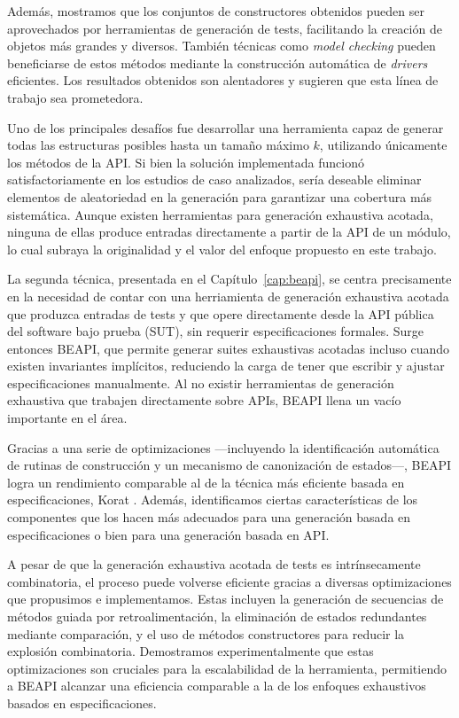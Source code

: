 Además, mostramos que los conjuntos de constructores obtenidos pueden ser aprovechados por herramientas de generación de tests, facilitando la creación de objetos más grandes y diversos. 
También técnicas como \emph{model checking} pueden beneficiarse de estos métodos mediante la construcción automática de \emph{drivers} eficientes. 
Los resultados obtenidos son alentadores y sugieren que esta línea de trabajo sea prometedora.

Uno de los principales desafíos fue desarrollar una herramienta capaz de generar todas las estructuras posibles hasta un tamaño máximo \(k\), 
utilizando únicamente los métodos de la API. Si bien la solución implementada funcionó satisfactoriamente en los estudios de caso analizados, 
sería deseable eliminar elementos de aleatoriedad en la generación para garantizar una cobertura más sistemática. 
Aunque existen herramientas para generación exhaustiva acotada, ninguna de ellas produce entradas directamente a partir de la API de un módulo, 
lo cual subraya la originalidad y el valor del enfoque propuesto en este trabajo.

La segunda técnica, presentada en el Capítulo~\ref{cap:beapi}, se centra precisamente en la necesidad de contar con una herriamienta
de generación exhaustiva acotada que produzca entradas de tests y que opere directamente desde la API pública del software bajo prueba (SUT), sin requerir especificaciones formales.
Surge entonces BEAPI, que permite generar suites exhaustivas acotadas incluso cuando existen invariantes implícitos, 
reduciendo la carga de tener que escribir y ajustar especificaciones manualmente.
Al no existir herramientas de generación exhaustiva que trabajen directamente sobre APIs, BEAPI llena un vacío importante en el área.

Gracias a una serie de optimizaciones —incluyendo la identificación automática de rutinas de construcción y un mecanismo de canonización de estados—, 
BEAPI logra un rendimiento comparable al de la técnica más eficiente basada en especificaciones, Korat \cite{Boyapati02}. 
Además, identificamos ciertas características de los componentes que los hacen más adecuados para una generación basada en especificaciones o bien para una generación basada en API.

A pesar de que la generación exhaustiva acotada de tests es intrínsecamente combinatoria, 
el proceso puede volverse eficiente gracias a diversas optimizaciones que propusimos e implementamos. 
Estas incluyen la generación de secuencias de métodos guiada por retroalimentación, la eliminación de estados redundantes mediante comparación, 
y el uso de métodos constructores para reducir la explosión combinatoria. 
Demostramos experimentalmente que estas optimizaciones son cruciales para la escalabilidad de la herramienta, 
permitiendo a BEAPI alcanzar una eficiencia comparable a la de los enfoques exhaustivos basados en especificaciones.

